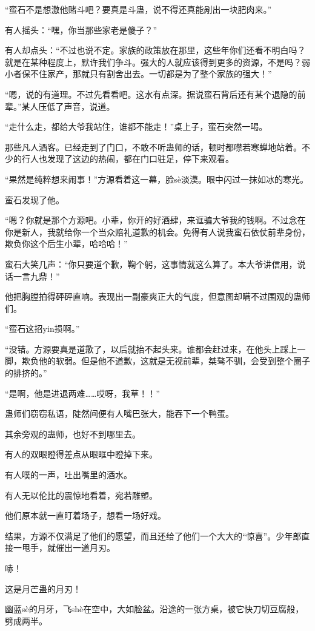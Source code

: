 \begin{this_body}
“蛮石不是想激他赌斗吧？要真是斗蛊，说不得还真能剐出一块肥肉来。”

有人摇头：“嘿，你当那些家老是傻子？”

有人却点头：“不过也说不定。家族的政策放在那里，这些年你们还看不明白吗？就是在某种程度上，默许我们争斗。强大的人就应该得到更多的资源，不是吗？弱小者保不住家产，那就只有割舍出去。一切都是为了整个家族的强大！”

“嗯，说的有道理。不过先看看吧。这水有点深。据说蛮石背后还有某个退隐的前辈。”某人压低了声音，说道。

“走什么走，都给大爷我站住，谁都不能走！”桌上子，蛮石突然一喝。

那些凡人酒客。已经走到了门口，不敢不听蛊师的话，顿时都噤若寒蝉地站着。不少的行人也发现了这边的热闹，都在门口驻足，停下来观看。

“果然是纯粹想来闹事！”方源看着这一幕，脸sè淡漠。眼中闪过一抹如冰的寒光。

蛮石发现了他。

“嗯？你就是那个方源吧。小辈，你开的好酒肆，来诓骗大爷我的钱啊。不过念在你是新人，我就给你一个当众赔礼道歉的机会。免得有人说我蛮石依仗前辈身份，欺负你这个后生小辈，哈哈哈！”

蛮石大笑几声：“你只要道个歉，鞠个躬，这事情就这么算了。本大爷讲信用，说话一言九鼎！”

他把胸膛拍得砰砰直响。表现出一副豪爽正大的气度，但意图却瞒不过围观的蛊师们。

“蛮石这招yin损啊。”

“没错。方源要真是道歉了，以后就抬不起头来。谁都会赶过来，在他头上踩上一脚，欺负他的软弱。但是他不道歉，这就是无视前辈，桀骜不驯，会受到整个圈子的排挤的。”

“是啊，他是进退两难……哎呀，我草！！”

蛊师们窃窃私语，陡然间便有人嘴巴张大，能吞下一个鸭蛋。

其余旁观的蛊师，也好不到哪里去。

有人的双眼瞪得差点从眼眶中瞪掉下来。

有人噗的一声，吐出嘴里的酒水。

有人无以伦比的震惊地看着，宛若雕塑。

他们原本就一直盯着场子，想看一场好戏。

结果，方源不仅满足了他们的愿望，而且还给了他们一个大大的“惊喜”。少年郎直接一甩手，就催出一道月刃。

哧！

这是月芒蛊的月刃！

幽蓝sè的月牙，飞shè在空中，大如脸盆。沿途的一张方桌，被它快刀切豆腐般，劈成两半。


\end{this_body}
